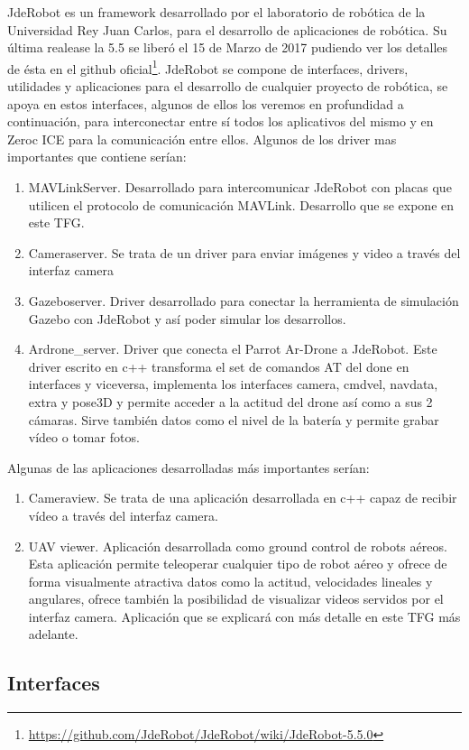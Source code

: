 JdeRobot es un framework desarrollado por el laboratorio de rob\'otica de la Universidad Rey Juan Carlos, para el desarrollo de aplicaciones de rob\'otica. Su última realease la 5.5 se liber\'o el 15 de Marzo de 2017 pudiendo ver los detalles de ésta en el github oficial\footnote{\url{https://github.com/JdeRobot/JdeRobot/wiki/JdeRobot-5.5.0}}.
JdeRobot se compone de interfaces, drivers, utilidades y aplicaciones para el desarrollo de cualquier proyecto de rob\'otica, se apoya en estos interfaces, algunos de ellos los veremos en profundidad a continuaci\'on, para interconectar entre sí todos los aplicativos del mismo y en Zeroc ICE para la comunicaci\'on entre ellos.
Algunos de los driver mas importantes que contiene serían:
\begin{enumerate}
\item MAVLinkServer. Desarrollado para intercomunicar JdeRobot con placas que utilicen el protocolo de comunicaci\'on MAVLink. Desarrollo que se expone en este TFG.
\item Cameraserver. Se trata de un driver para enviar imágenes y video a través del interfaz camera
\item Gazeboserver. Driver desarrollado para conectar la herramienta de simulaci\'on Gazebo con JdeRobot y así poder simular los desarrollos.
\item Ardrone\_server. Driver que conecta el Parrot Ar-Drone a JdeRobot. Este driver escrito en c++ transforma el set de comandos AT del done en interfaces y viceversa, implementa los interfaces camera, cmdvel, navdata, extra y pose3D y permite acceder a la actitud del drone así como a sus 2 cámaras. Sirve también datos como el nivel de la batería y permite grabar vídeo o tomar fotos.
\end{enumerate}
Algunas de las aplicaciones desarrolladas más importantes serían:
\begin{enumerate}
\item Cameraview. Se trata de una aplicaci\'on desarrollada en c++ capaz de recibir vídeo a través del interfaz camera.
\item UAV viewer. Aplicaci\'on desarrollada como ground control de robots aéreos. Esta aplicaci\'on permite teleoperar cualquier tipo de robot aéreo y ofrece de forma visualmente atractiva datos como la actitud, velocidades lineales y angulares, ofrece también la posibilidad de visualizar videos servidos por el interfaz camera. Aplicación que se explicará con más detalle en este TFG más adelante.
\end{enumerate}
\subsection{Interfaces}

